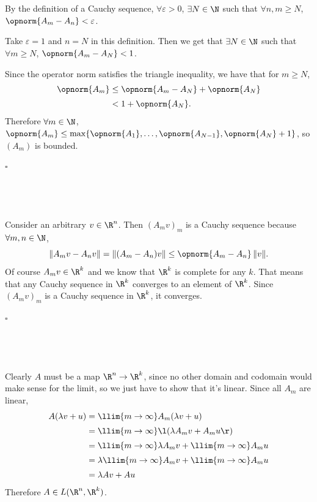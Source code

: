 \documentclass[a4paper]{article}
\begin{document}
\subsection{~} %

By the definition of a Cauchy sequence, $\forall \varepsilon > 0$, $\exists N \in \N$ such that $\forall n, m \ge N$, $\opnorm{A_m - A_n} < \varepsilon$.

Take $\varepsilon = 1$ and $n = N$ in this definition. Then we get that $\exists N \in \N$ such that $\forall m \ge N$, $\opnorm{A_m - A_N} < 1$.

Since the operator norm satisfies the triangle inequality, we have that for $m \ge N$,
\begin{align*}
\opnorm{A_m} &\le \opnorm{A_m - A_N} + \opnorm{A_N} \\[0.5ex]
&< 1 + \opnorm{A_N}.
\end{align*}
Therefore $\forall m \in \N$, $\opnorm{A_m} \le \max \{ \opnorm{A_1}, \dotsc, \opnorm{A_{N-1}}, \opnorm{A_N} + 1 \}$, so $(A_m)$ is bounded.

\hfill $\square$

\subsection{~} %

Consider an arbitrary $v \in \R^n$. Then ${(A_m v)}_m$ is a Cauchy sequence because $\forall m, n \in \N$, \[ \|A_m v - A_n v \| = \| (A_m - A_n) v \| \le \opnorm{A_m - A_n} \, \| v \|. \]
Of course $A_m v \in \R^k$ and we know that $\R^k$ is complete for any $k$. That means that any Cauchy sequence in $\R^k$ converges to an element of $\R^k$. Since ${(A_m v)}_m$ is a Cauchy sequence in $\R^k$, it converges.

\hfill $\square$

\subsection{~} %

Clearly $A$ must be a map $\R^n \to \R^k$, since no other domain and codomain would make sense for the limit, so we just have to show that it's linear. Since all $A_m$ are linear,
\begin{align*}
A(\lambda v + u) &= \llim{m \to \infty} A_m (\lambda v + u) \\[0.5ex]
&= \llim{m \to \infty} \l( \lambda A_m v + A_m u \r) \\[0.5ex]
&= \llim{m \to \infty} \lambda A_m v + \llim{m \to \infty} A_m u \\[0.5ex]
&= \lambda \llim{m \to \infty} A_m v + \llim{m \to \infty} A_m u \\[0.5ex]
&= \lambda A v + A u
\end{align*}
Therefore $A \in L(\R^n, \R^k)$.
\end{document}
